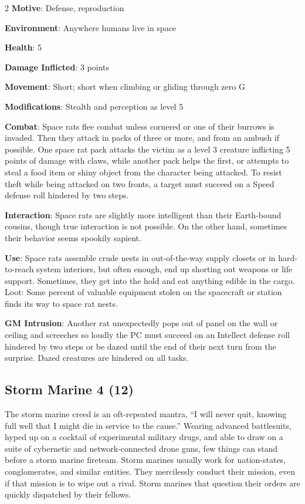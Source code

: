 \begin{multicols}{2}
\textbf{Motive}: Defense, reproduction 

\textbf{Environment}: Anywhere humans live in space 

\textbf{Health}: 5 

\textbf{Damage Inflicted}: 3 points 

\textbf{Movement}: Short; short when climbing or gliding through zero G 

\textbf{Modifications}: Stealth and perception as level 5 

\textbf{Combat}: Space rats flee combat unless cornered or one of their burrows is invaded. Then they attack in packs of three or more, and from an ambush if possible. One space rat pack attacks the victim as a level 3 creature inflicting 5 points of damage with claws, while another pack helps the first, or attempts to steal a food item or shiny object from the character being attacked. To resist theft while being attacked on two fronts, a target must succeed on a Speed defense roll hindered by two steps. 

\textbf{Interaction}: Space rats are slightly more intelligent than their Earth-bound cousins, though true interaction is not possible. On the other hand, sometimes their behavior seems spookily sapient. 

\textbf{Use}: Space rats assemble crude nests in out-of-the-way supply closets or in hard-to-reach system interiors, but often enough, end up shorting out weapons or life support. Sometimes, they get into the hold and eat anything edible in the cargo. 
Loot: Some percent of valuable equipment stolen on the spacecraft or station finds its way to space rat nests.

\textbf{GM Intrusion}: Another rat unexpectedly pops out of panel on the wall or ceiling and screeches so loudly the PC must succeed on an Intellect defense roll hindered by two steps or be dazed until the end of their next turn from the surprise. Dazed creatures are hindered on all tasks.

\subsection{Storm Marine 4 (12)}

The storm marine creed is an oft-repeated mantra, “I will never quit, knowing full well that I might die in service to the cause.” Wearing advanced battlesuits, hyped up on a cocktail of experimental military drugs, and able to draw on a suite of cybernetic and network-connected drone guns, few things can stand before a storm marine fireteam. Storm marines usually work for nation-states, conglomerates, and similar entities. They mercilessly conduct their mission, even if that mission is to wipe out a rival. Storm marines that question their orders are quickly dispatched by their fellows. 


\end{multicols}
